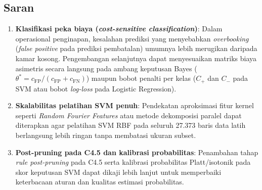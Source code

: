 \subsection{Saran}

\begin{enumerate}
  \item \textbf{Klasifikasi peka biaya (\textit{cost-sensitive classification})}: Dalam operasional
        penginapan, kesalahan prediksi yang menyebabkan \textit{overbooking} (\textit{false positive} pada
        prediksi pembatalan) umumnya lebih merugikan daripada kamar kosong. Pengembangan selanjutnya
        dapat menyesuaikan matriks biaya asimetris secara langsung pada ambang keputusan Bayes
        ($\theta^* = c_{\text{FP}} / (c_{\text{FP}} + c_{\text{FN}})$) maupun bobot penalti per kelas
        ($C_+$ dan $C_-$ pada SVM atau bobot \textit{log-loss} pada Logistic Regression).
  \item \textbf{Skalabilitas pelatihan SVM penuh}: Pendekatan aproksimasi fitur kernel seperti
        \textit{Random Fourier Features} atau metode dekomposisi paralel dapat diterapkan agar pelatihan
        SVM RBF pada seluruh 27.373 baris data latih berlangsung lebih ringan tanpa membatasi ukuran subset.
  \item \textbf{Post-pruning pada C4.5 dan kalibrasi probabilitas}: Penambahan tahap \textit{rule
        post-pruning} pada C4.5 serta kalibrasi probabilitas Platt/isotonik pada skor keputusan SVM
        dapat dikaji lebih lanjut untuk memperbaiki keterbacaan aturan dan kualitas estimasi probabilitas.
\end{enumerate}
\fussy
